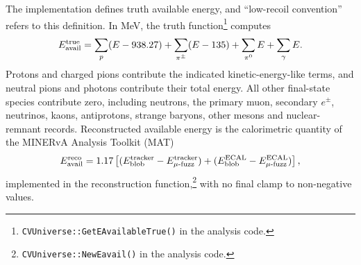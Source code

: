 \label{sec:3d-method}
\label{sec:eavail-definition}
The implementation defines truth available energy, and ``low-recoil convention'' refers to this definition. In MeV, the truth function\footnote{\texttt{CVUniverse::GetEAvailableTrue()} in the analysis code.} computes
\begin{equation}
 E_{\rm avail}^{\rm true}=
 \sum_{p}(E-938.27)
 +\sum_{\pi^\pm}(E-135)
 +\sum_{\pi^0}E
 +\sum_{\gamma}E .
 \label{eq:eavail-implemented}
\end{equation}
Protons and charged pions contribute the indicated kinetic-energy-like terms, and neutral pions and photons contribute their total energy. All other final-state species contribute zero, including neutrons, the primary muon, secondary $e^\pm$, neutrinos, kaons, antiprotons, strange baryons, other mesons and nuclear-remnant records. Reconstructed available energy is the calorimetric quantity of the MINERvA Analysis Toolkit (MAT)
\begin{equation}
 E_{\rm avail}^{\rm reco}=1.17\left[(E_{\rm blob}^{\rm tracker}
 -E_{\mu\text{-fuzz}}^{\rm tracker})+(E_{\rm blob}^{\rm ECAL}
 -E_{\mu\text{-fuzz}}^{\rm ECAL})\right],
 \label{eq:eavail-reco-implemented}
\end{equation}
implemented in the reconstruction function,\footnote{\texttt{CVUniverse::NewEavail()} in the analysis code.} with no final clamp to non-negative values.

